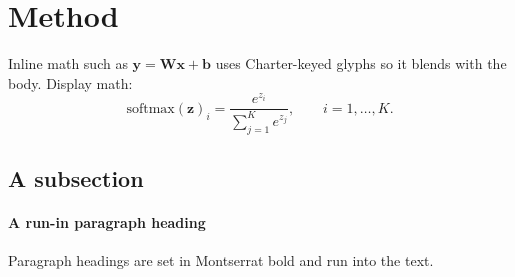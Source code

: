 \section{Method}
\label{sec:method}
Inline math such as $\mathbf{y} = \mathbf{W}\mathbf{x} + \mathbf{b}$ uses
Charter-keyed glyphs so it blends with the body. Display math:
\begin{equation}
  \label{eq:softmax}
  \mathrm{softmax}(\mathbf{z})_i = \frac{e^{z_i}}{\sum_{j=1}^{K} e^{z_j}},
  \qquad i = 1,\dots,K.
\end{equation}

\subsection{A subsection}
\lipsum[2]

\paragraph{A run-in paragraph heading}
Paragraph headings are set in Montserrat bold and run into the text.
